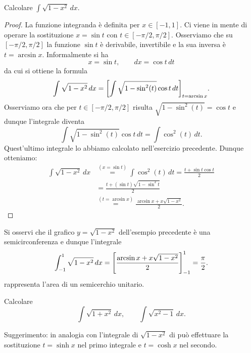 \begin{example}
Calcolare
$\int \sqrt{1-x^2}\, dx$.
\end{example}
\begin{proof}
La funzione integranda è definita per $x\in [-1,1]$.
Ci viene in mente di operare la sostituzione $x=\sin t$
con $t\in [-\pi/2, \pi/2]$.
Osserviamo che su $[-\pi/2,\pi/2]$ la funzione $\sin t$ è derivabile,
invertibile e la sua inversa è $t = \arcsin x$.
Informalmente si ha
\[
 x= \sin t, \qquad dx = \cos t \, dt
\]
da cui si ottiene la formula
\[
 \int \sqrt{1-x^2}\, dx = {\left[ \int \sqrt{1-\sin^2(t)} \cos t\, dt \right]}_{t=\arcsin x}.
\]
Osserviamo ora che per $t\in [-\pi/2, \pi/2]$ risulta $\sqrt{1-\sin^2(t)}=\cos t$
e dunque l'integrale
diventa
\[
 \int \sqrt{1-\sin^2(t)}\cos t\, dt = \int \cos^2(t)\, dt.
\]
Quest'ultimo integrale lo abbiamo calcolato nell'esercizio precedente.
Dunque otteniamo:
\begin{align*}
 \int \sqrt{1-x^2}\, dx
 &\stackrel{(x=\sin t)}= \int \cos^2(t)\, dt
 = \frac{t + \sin t \cos t}{2} \\
 &= \frac{t + (\sin t) \sqrt{1-\sin^2 t}}{2} \\
 &\stackrel{(t=\arcsin x)}= \frac{\arcsin x + x \sqrt{1-x^2}}{2}.
\end{align*}
\end{proof}

Si osservi che il grafico $y=\sqrt{1-x^2}$ dell'esempio precedente
è una semicirconferenza e dunque l'integrale 
\[
 \int_{-1}^1 \sqrt{1-x^2}\, dx = {\left[ \frac{\arcsin x +x\sqrt{1-x^2}}{2} \right]}_{-1}^{1}
 = \frac{\pi}{2}.
\]
rappresenta l'area di un semicerchio unitario.

\begin{exercise}
Calcolare
\[
 \int \sqrt{1+x^2}\, dx, \qquad \int \sqrt{x^2-1}\, dx.  
\]

Suggerimento: in analogia con l'integrale di $\sqrt{1-x^2}$
di può effettuare la sostituzione $t=\sinh x$ nel primo 
integrale e $t=\cosh x$ nel secondo.
\end{exercise}

